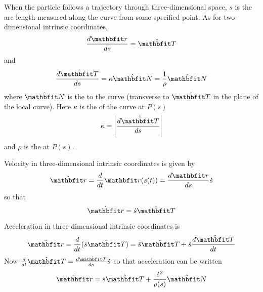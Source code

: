 When the particle follows a trajectory through three-dimensional space, 
$s$ is the arc length measured along the curve from some specified point.
As for two-dimensional intrinsic coordinates,
$$\der{\vect{r}}{s}=\Tvect$$
and
$$\der{\Tvect}{s}=\kappa \Nvect=\frac{1}{\rho}\Nvect$$
where $\Nvect$ is the  to the curve (transverse to
$\Tvect$ in the plane of the local curve).  Here $\kappa$ is the 
 of the curve at $P(s)$
$$\kappa=\left|\der{\Tvect}{s}\right|$$
and $\rho$ is the  at $P(s)$.

Velocity in three-dimensional intrinsic coordinates is given by
$$\dot{\vect{r}}=\dbd{t}\vect{r}(s(t))=\der{\vect{r}}{s}\dot{s}$$
so that
$$\dot{\vect{r}}=\dot{s}\Tvect$$

Acceleration in three-dimensional intrinsic coordinates is 
$$\ddot{\vect{r}}=\dbd{t}(\dot{s}\Tvect)=\ddot{s}\Tvect+\dot{s}
\der{\Tvect}{t}$$
Now $\dbd{t}\Tvect=\der{\Tvect}{s}\dot{s}$ so that acceleration can be
written
$$\ddot{\vect{r}}=\ddot{s}\Tvect+\frac{\dot{s}^2}{\rho(s)}\Nvect$$






